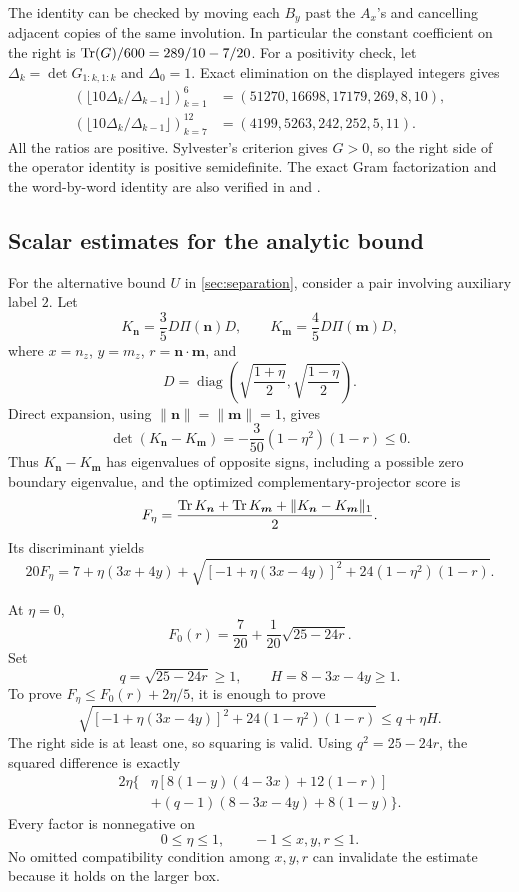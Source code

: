 The identity can be checked by moving each \(B_y\) past the \(A_x\)'s
and cancelling adjacent copies of the same involution. In particular the
constant coefficient on the right is
\(\operatorname{Tr}(G)/600=289/10-7/20\). For a positivity check, let
\(\Delta_k=\det G_{1:k,1:k}\) and \(\Delta_0=1\).
Exact elimination on the displayed integers gives
\[
\begin{aligned}
(\lfloor 10\Delta_k/\Delta_{k-1}\rfloor)_{k=1}^{6}
 &= (51270,16698,17179,269,8,10),\\
(\lfloor 10\Delta_k/\Delta_{k-1}\rfloor)_{k=7}^{12}
 &= (4199,5263,242,252,5,11).
\end{aligned}
\]
All the ratios are positive. Sylvester's criterion gives \(G>0\), so the
right side of the operator identity is positive semidefinite. The exact
Gram factorization and the word-by-word identity are also verified in
 and .

\subsection{Scalar estimates for the analytic bound}

For the alternative bound \(U\) in \cref{sec:separation}, consider
a pair involving auxiliary label \(2\). Let
\[
K_{\bm n}=\frac35D \Pi(\bm n)D,\qquad
K_{\bm m}=\frac45D \Pi(\bm m)D,
\]
where \(x=n_z\), \(y=m_z\), \(r=\bm n\cdot\bm m\), and
\[
D=\operatorname{diag}\!\left(
\sqrt{\frac{1+\eta}{2}},\sqrt{\frac{1-\eta}{2}}\right).
\]
Direct expansion, using \(\|\bm n\|=\|\bm m\|=1\), gives
\[
\det(K_{\bm n}-K_{\bm m})
=-\frac3{50}(1-\eta^2)(1-r)\le0.
\]
Thus \(K_{\bm n}-K_{\bm m}\) has eigenvalues of opposite signs, including a
possible zero boundary eigenvalue, and the optimized complementary-projector
score is
\[
F_\eta=
\frac{\operatorname{Tr} K_{\bm n}+\operatorname{Tr} K_{\bm m}
      +\|K_{\bm n}-K_{\bm m}\|_1}{2}.
\]
Its discriminant yields
\[
20F_\eta=
7+\eta(3x+4y)+
\sqrt{[-1+\eta(3x-4y)]^2+24(1-\eta^2)(1-r)}.
\]

At \(\eta=0\),
\[
F_0(r)=\frac7{20}+\frac1{20}\sqrt{25-24r}.
\]
Set
\[
q=\sqrt{25-24r}\ge1,\qquad H=8-3x-4y\ge1.
\]
To prove \(F_\eta\le F_0(r)+2\eta/5\), it is enough to prove
\[
\sqrt{[-1+\eta(3x-4y)]^2+24(1-\eta^2)(1-r)}
\le q+\eta H.
\]
The right side is at least one, so squaring is valid. Using
\(q^2=25-24r\), the squared difference is exactly
\[
\begin{aligned}
2\eta\{&
\eta[8(1-y)(4-3x)+12(1-r)]\\
&+(q-1)(8-3x-4y)+8(1-y)\}.
\end{aligned}
\]
Every factor is nonnegative on
\[
0\le\eta\le1,\qquad -1\le x,y,r\le1.
\]
No omitted compatibility condition among \(x,y,r\) can invalidate the
estimate because it holds on the larger box.

